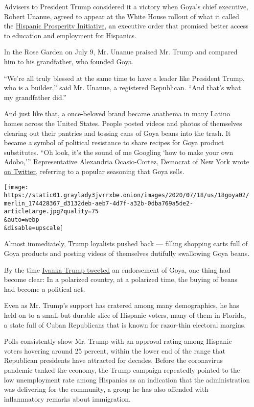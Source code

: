 Advisers to President Trump considered it a victory when Goya's chief
executive, Robert Unanue, agreed to appear at the White House rollout of
what it called the
\href{https://www.whitehouse.gov/presidential-actions/executive-order-white-house-hispanic-prosperity-initiative/}{Hispanic
Prosperity Initiative}, an executive order that promised better access
to education and employment for Hispanics.

In the Rose Garden on July 9, Mr. Unanue praised Mr. Trump and compared
him to his grandfather, who founded Goya.

``We're all truly blessed at the same time to have a leader like
President Trump, who is a builder,'' said Mr. Unanue, a registered
Republican. ``And that's what my grandfather did.''

And just like that, a once-beloved brand became anathema in many Latino
homes across the United States. People posted videos and photos of
themselves clearing out their pantries and tossing cans of Goya beans
into the trash. It became a symbol of political resistance to share
recipes for Goya product substitutes. ``Oh look, it's the sound of me
Googling `how to make your own Adobo,''' Representative Alexandria
Ocasio-Cortez, Democrat of New York
\href{https://twitter.com/AOC/status/1281383352315125762}{wrote on
Twitter}, referring to a popular seasoning that Goya sells.

\texttt{[image: https://static01.graylady3jvrrxbe.onion/images/2020/07/18/us/18goya02/merlin\_174428367\_d3132deb-aeb7-4d7f-a32b-0dba769a5de2-articleLarge.jpg?quality=75\\\&auto=webp\\\&disable=upscale]}

Almost immediately, Trump loyalists pushed back --- filling shopping
carts full of Goya products and posting videos of themselves dutifully
swallowing Goya beans.

By the time
\href{https://twitter.com/IvankaTrump/status/1283221019684110337}{Ivanka
Trump tweeted} an endorsement of Goya, one thing had become clear: In a
polarized country, at a polarized time, the buying of beans had become a
political act.

Even as Mr. Trump's support has cratered among many demographics, he has
held on to a small but durable slice of Hispanic voters, many of them in
Florida, a state full of Cuban Republicans that is known for razor-thin
electoral margins.

Polls consistently show Mr. Trump with an approval rating among Hispanic
voters hovering around 25 percent, within the lower end of the range
that Republican presidents have attracted for decades. Before the
coronavirus pandemic tanked the economy, the Trump campaign repeatedly
pointed to the low unemployment rate among Hispanics as an indication
that the administration was delivering for the community, a group he has
also offended with inflammatory remarks about immigration.

